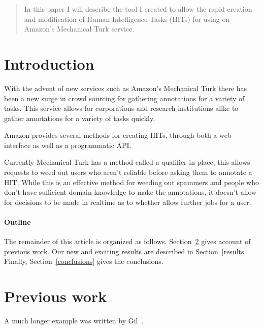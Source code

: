 \documentclass[11pt]{article}
\begin{document}
\maketitle

\begin{abstract}
In this paper I will describe the tool I created to allow the rapid creation and modification of Human Intelligence Tasks (HITs) for using on Amazon's Mechanical Turk service.
\end{abstract}

\section{Introduction}
With the advent of new services such as Amazon's Mechanical Turk there has been a new surge in crowd sourcing for gathering annotations for a variety of tasks.  This service allows for corporations and research institutions alike to gather annotations for a variety of tasks quickly.  

Amazon provides several methods for creating HITs, through both a web interface as well as a programmatic API.  

Currently Mechanical Turk has a method called a qualifier in place, this allows requests to weed out users who aren't reliable before asking them to annotate a HIT.  While this is an effective method for weeding out spammers and people who don't have sufficient domain knowledge to make the annotations, it doesn't allow for decisions to be made in realtime as to whether allow further jobs for a user.

\paragraph{Outline}
The remainder of this article is organized as follows.
Section~\ref{previous work} gives account of previous work.
Our new and exciting results are described in Section~\ref{results}.
Finally, Section~\ref{conclusions} gives the conclusions.

\section{Previous work}\label{previous work}
\cite{snow2008cheap}

A much longer \LaTeXe{} example was written by Gil~\cite{Gil:02}.
\end{document}
